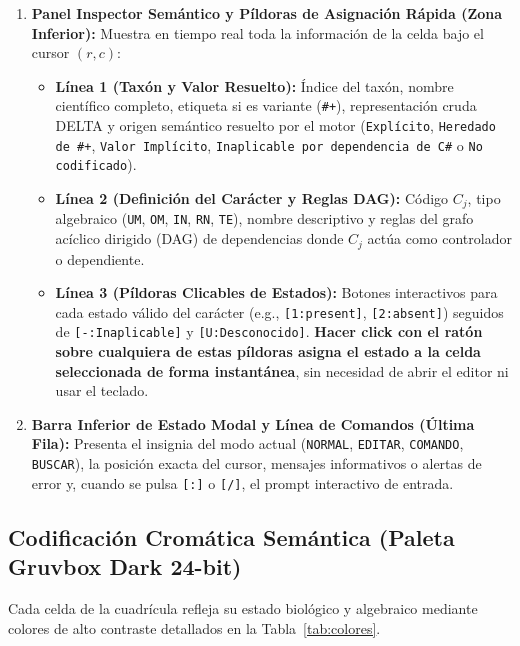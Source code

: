 \documentclass[11pt,a4paper]{article}
\newcommand{\keystroke}[1]{\texttt{[#1]}}
\begin{document}
\begin{enumerate}
    \item \textbf{Panel Inspector Semántico y Píldoras de Asignación Rápida (Zona Inferior):}
    Muestra en tiempo real toda la información de la celda bajo el cursor $(r, c)$:
    \begin{itemize}
        \item \textbf{Línea 1 (Taxón y Valor Resuelto):} Índice del taxón, nombre científico completo, etiqueta si es variante (\texttt{\#+}), representación cruda DELTA y origen semántico resuelto por el motor (\texttt{Explícito}, \texttt{Heredado de \#+}, \texttt{Valor Implícito}, \texttt{Inaplicable por dependencia de C\#} o \texttt{No codificado}).
        \item \textbf{Línea 2 (Definición del Carácter y Reglas DAG):} Código $C_j$, tipo algebraico (\texttt{UM}, \texttt{OM}, \texttt{IN}, \texttt{RN}, \texttt{TE}), nombre descriptivo y reglas del grafo acíclico dirigido (DAG) de dependencias donde $C_j$ actúa como controlador o dependiente.
        \item \textbf{Línea 3 (Píldoras Clicables de Estados):} Botones interactivos para cada estado válido del carácter (e.g., \texttt{[1:present]}, \texttt{[2:absent]}) seguidos de \texttt{[-:Inaplicable]} y \texttt{[U:Desconocido]}. \textbf{Hacer click con el ratón sobre cualquiera de estas píldoras asigna el estado a la celda seleccionada de forma instantánea}, sin necesidad de abrir el editor ni usar el teclado.
    \end{itemize}

    \item \textbf{Barra Inferior de Estado Modal y Línea de Comandos (Última Fila):}
    Presenta el insignia del modo actual (\texttt{NORMAL}, \texttt{EDITAR}, \texttt{COMANDO}, \texttt{BUSCAR}), la posición exacta del cursor, mensajes informativos o alertas de error y, cuando se pulsa \keystroke{:} o \keystroke{/}, el prompt interactivo de entrada.
\end{enumerate}

\subsection{Codificación Cromática Semántica (Paleta Gruvbox Dark 24-bit)}
Cada celda de la cuadrícula refleja su estado biológico y algebraico mediante colores de alto contraste detallados en la Tabla~\ref{tab:colores}.
\end{document}

